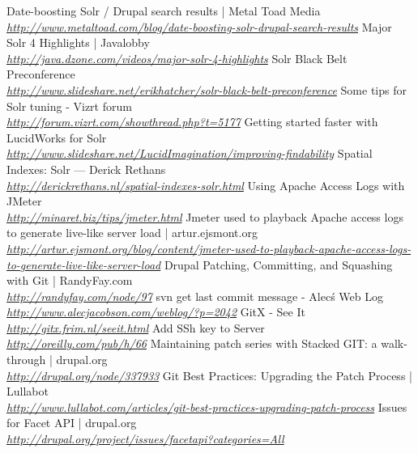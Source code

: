 \begin{thebibliography}{99}
		Date-boosting Solr / Drupal search results | Metal Toad Media\\
		\emph{\url{http://www.metaltoad.com/blog/date-boosting-solr-drupal-search-results}}
		Major Solr 4 Highlights | Javalobby\\
		\emph{\url{http://java.dzone.com/videos/major-solr-4-highlights}}
		Solr Black Belt Pre\-conference \\
		\emph{\url{http://www.slideshare.net/erikhatcher/solr-black-belt-preconference}}
		Some tips for Solr tuning - Vizrt forum\\
		\emph{\url{http://forum.vizrt.com/showthread.php?t=5177}}
		Getting started faster with LucidWorks for Solr \\
		\emph{\url{http://www.slideshare.net/LucidImagination/improving-findability}}
		Spatial Indexes: Solr — Derick Rethans \\
		\emph{\url{http://derickrethans.nl/spatial-indexes-solr.html}}
		Using Apache Access Logs with JMeter \\
		\emph{\url{http://minaret.biz/tips/jmeter.html}}
		Jmeter used to playback Apache access logs to generate live-like server load | artur.ejsmont.org \\
		\emph{\url{http://artur.ejsmont.org/blog/content/jmeter-used-to-playback-apache-access-logs-to-generate-live-like-server-load}}
		Drupal Patching, Committing, and Squashing with Git | RandyFay.com\\
		\emph{\url{http://randyfay.com/node/97}}
		svn get last commit message - Alec\'s Web Log \\
		\emph{\url{http://www.alecjacobson.com/weblog/?p=2042}}
		GitX - See It \\
		\emph{\url{http://gitx.frim.nl/seeit.html}}
		Add SSh key to Server \\
		\emph{\url{http://oreilly.com/pub/h/66}}
		Maintaining patch series with Stacked GIT: a walk-through | drupal.org \\
		\emph{\url{http://drupal.org/node/337933}}
		Git Best Practices: Upgrading the Patch Process | Lullabot \\
		\emph{\url{http://www.lullabot.com/articles/git-best-practices-upgrading-patch-process}}
		Issues for Facet API | drupal.org\\
		\emph{\url{http://drupal.org/project/issues/facetapi?categories=All}}

\end{thebibliography}
